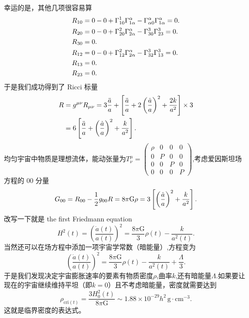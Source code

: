 \documentclass[../天体物理基础.tex]{subfiles}
\begin{document}
幸运的是，其他几项很容易算
\begin{align}
R_{10}&=0-0+\Gamma_{10}^{1}\Gamma_{1\alpha}^{\alpha}-\Gamma_{\alpha0}^{\alpha}\Gamma_{1\alpha}^{\alpha}=0.\notag\\
R_{20}&=0-0+\Gamma_{20}^{2}\Gamma_{2\alpha}^{\alpha}-\Gamma_{30}^{3}\Gamma_{23}^{3}=0.\notag\\
R_{30}&=0.\notag\\
R_{12}&=0-0+\Gamma_{12}^{2}\Gamma_{2\alpha}^{\alpha}-\Gamma_{32}^{3}\Gamma_{13}^{3}=0.\notag\\
R_{13}&=0.\notag\\
R_{23}&=0.\notag
\end{align}
于是我们成功得到了 Ricci 标量
\begin{align}
R&=g^{\mu\nu}R_{\mu\nu}=3\frac{\ddot a}{a}+\left[\frac{\ddot a}{a}+2\left(\frac{\dot a}{a}\right)^{2}+\frac{2k}{a^{2}}\right]\times3\notag\\
&=6\left[\frac{\ddot a}{a}+\left(\frac{\dot a}{a}\right)^{2}+\frac{k}{a^{2}}\right].\notag
\end{align}
均匀宇宙中物质是理想流体，能动张量为$T^{\mu}_{\nu}=\begin{pmatrix}
\rho & 0 & 0 & 0\\
0 & P & 0 & 0\\
0 & 0 & P & 0\\
0 & 0 & 0 & P
\end{pmatrix}$,考虑爱因斯坦场方程的 00 分量
\begin{equation}
G_{00}=R_{00}-\frac{1}{2}g_{00}R=8\pi\mathrm{G}\rho=3\left[\left(\frac{\dot a}{a}\right)^{2}+\frac{k}{a^{2}}\right].\notag
\end{equation}
改写一下就是 the first Friedmann equation
\begin{equation}
H^{2}\left(t\right)=\left(\frac{\dot{a}\left(t\right)}{a\left(t\right)}\right)^{2}=\frac{8\pi\mathrm{G}}{3}\rho\left(t\right)-\frac{k}{a^{2}\left(t\right)}.
\end{equation}
当然还可以在场方程中添加一项宇宙学常数（暗能量）,方程变为
\begin{equation}
\left(\frac{\dot{a}\left(t\right)}{a\left(t\right)}\right)^{2}=\frac{8\pi\mathrm{G}}{3}\rho\left(t\right)-\frac{k}{a^{2}\left(t\right)}+\frac{\Lambda}{3}.\label{1.6.8}
\end{equation}
于是我们发现决定宇宙膨胀速率的要素有物质密度$\rho$,曲率$k$,还有暗能量$\Lambda$.如果要让现在的宇宙继续维持平坦（即$k=0$）且不考虑暗能量，密度就需要达到
\begin{equation}
\rho_{\text{cri}\left(t\right)}=\frac{3H_{0}^{2}\left(t\right)}{8\pi\mathrm{G}}\sim1.88\times10^{-29}h^{2}\,\mathrm{g\cdot{}cm^{-3}}.
\end{equation}
这就是临界密度的表达式。
\end{document}
